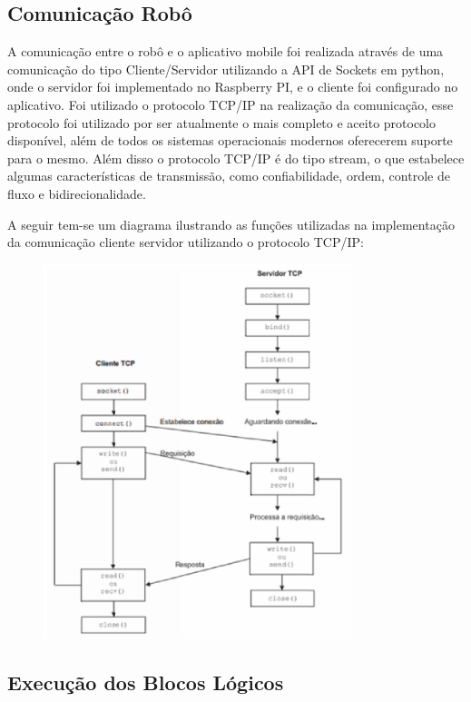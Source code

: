 \subsection{Comunicação Robô}

A comunicação entre o robô e o aplicativo mobile foi realizada através de uma comunicação do tipo Cliente/Servidor utilizando a API de Sockets em python, onde o servidor foi implementado no Raspberry PI, e o cliente foi configurado no aplicativo. Foi utilizado o protocolo TCP/IP na realização da comunicação, esse protocolo foi utilizado por ser atualmente o mais completo e aceito protocolo disponível, além de todos os sistemas operacionais modernos oferecerem suporte para o mesmo. Além disso o protocolo TCP/IP é do tipo stream, o que estabelece algumas características de transmissão, como confiabilidade, ordem, controle de fluxo e bidirecionalidade.

A seguir tem-se um diagrama ilustrando as funções utilizadas na implementação da comunicação cliente servidor utilizando o protocolo TCP/IP:

\begin{figure}[H]
    \centering
    \includegraphics[width=0.8\textwidth]{figuras/diagrama_socket.eps}
    \caption{}
    \label{fig:catia01}
\end{figure}

\subsection{Execução dos Blocos Lógicos}

